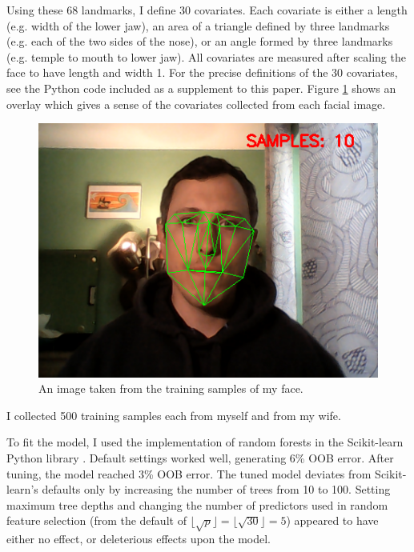 \documentclass[10pt,a4paper]{article}
\begin{document}
Using these 68 landmarks, I define 30 covariates. Each covariate is either a length (e.g. width of the lower jaw), an area of a triangle defined by three landmarks (e.g. each of the two sides of the nose), or an angle formed by three landmarks (e.g. temple to mouth to lower jaw). All covariates are measured after scaling the face to have length and width 1. For the precise definitions of the 30 covariates, see the Python code included as a supplement to this paper. Figure \ref{fig:covariates} shows an overlay which gives a sense of the covariates collected from each facial image.
\begin{figure}
	\centering
	\includegraphics[width=0.8\linewidth]{00216}
	\caption{An image taken from the training samples of my face.}
	\label{fig:covariates}
\end{figure}
I collected 500 training samples each from myself and from my wife.

To fit the model, I used the implementation of random forests in the Scikit-learn Python library \citep{scikit-learn}. Default settings worked well, generating 6\% OOB error. After tuning, the model reached 3\% OOB error. The tuned model deviates from Scikit-learn's defaults only by increasing the number of trees from 10 to 100. Setting maximum tree depths and changing the number of predictors used in random feature selection (from the default of $\lfloor \sqrt p\rfloor=\lfloor \sqrt {30}\rfloor=5$) appeared to have either no effect, or deleterious effects upon the model.
\end{document}
